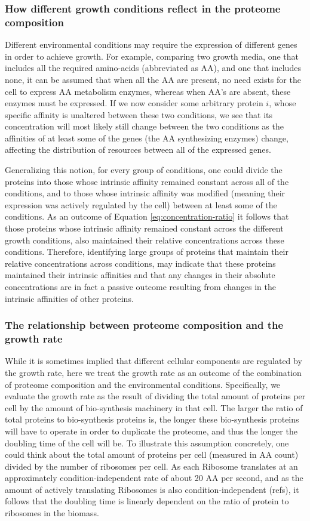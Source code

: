 \documentclass[notitlepage]{article}
\begin{document}
\subsubsection{How different growth conditions reflect in the proteome composition}
Different environmental conditions may require the expression of different genes in order to achieve growth.
For example, comparing two growth media, one that includes all the required amino-acids (abbreviated as AA), and one that includes none, it can be assumed that when all the AA are present, no need exists for the cell to express AA metabolism enzymes, whereas when AA's are absent, these enzymes must be expressed.
If we now consider some arbitrary protein $i$, whose specific affinity is unaltered between these two conditions, we see that its concentration will most likely still change between the two conditions as the affinities of at least some of the genes (the AA synthesizing enzymes) change, affecting the distribution of resources between all of the expressed genes.

Generalizing this notion, for every group of conditions, one could divide the proteins into those whose intrinsic affinity remained constant across all of the conditions, and to those whose intrinsic affinity was modified (meaning their expression was actively regulated by the cell) between at least some of the conditions.
As an outcome of Equation \ref{eq:concentration-ratio} it follows that those proteins whose intrinsic affinity remained constant across the different growth conditions, also maintained their relative concentrations across these conditions.
Therefore, identifying large groups of proteins that maintain their relative concentrations across conditions, may indicate that these proteins maintained their intrinsic affinities and that any changes in their absolute concentrations are in fact a passive outcome resulting from changes in the intrinsic affinities of other proteins.

\subsubsection{The relationship between proteome composition and the growth rate}
While it is sometimes implied that different cellular components are regulated by the growth rate, here we treat the growth rate as an outcome of the combination of proteome composition and the environmental conditions.
Specifically, we evaluate the growth rate as the result of dividing the total amount of proteins per cell by the amount of bio-synthesis machinery in that cell.
The larger the ratio of total proteins to bio-synthesis proteins is, the longer these bio-synthesis proteins will have to operate in order to duplicate the proteome, and thus the longer the doubling time of the cell will be.
To illustrate this assumption concretely, one could think about the total amount of proteins per cell (measured in AA count) divided by the number of ribosomes per cell.
As each Ribosome translates at an approximately condition-independent rate of about 20 AA per second, and as the amount of actively translating Ribosomes is also condition-independent (refs), it follows that the doubling time is linearly dependent on the ratio of protein to ribosomes in the biomass.
\end{document}
